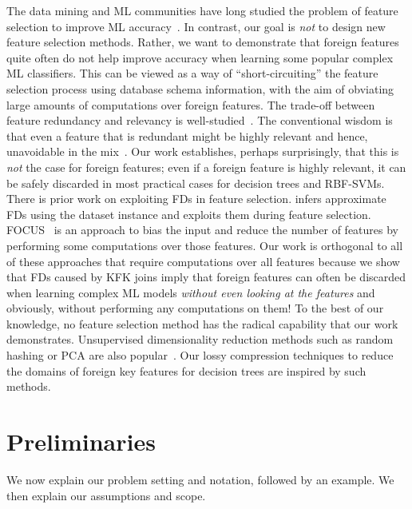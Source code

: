 \documentclass[sigconf]{acmart}
\begin{document}
The data mining and ML communities have long studied the problem of feature selection to improve ML accuracy~\cite{guyonbook,hastie}.
In contrast, our goal is \textit{not} to design new feature selection methods. Rather, we want to demonstrate that foreign features quite often do not help improve 
accuracy when learning some popular complex ML classifiers. This can be viewed as a way of ``short-circuiting'' the feature selection process using database schema 
information, with the aim of obviating large amounts of computations over foreign features.
The trade-off between feature redundancy and relevancy is well-studied~\cite{guyonbook,leiyu,daphnekoller}. The conventional wisdom is that even a feature that is 
redundant might be highly relevant and hence, unavoidable in the mix~\cite{guyonbook}. Our work establishes, perhaps surprisingly, that this is \textit{not} the case 
for foreign features; even if a foreign feature is highly relevant, it can be safely discarded in most practical cases for decision trees and RBF-SVMs.
There is prior work on exploiting FDs in feature selection.
\cite{approxfds} infers approximate FDs using the dataset instance and exploits them during feature selection.
FOCUS~\cite{focus} is an approach to bias the input and reduce the number of features by performing some computations over those features.
Our work is orthogonal to all of these approaches that require computations over all features because we show that FDs caused by KFK joins imply that foreign features 
can often be discarded when learning complex ML models \textit{without even looking at the features} and obviously, without performing any computations on them!
To the best of our knowledge, no feature selection method has the radical capability that our work demonstrates.
Unsupervised dimensionality reduction methods such as random hashing or PCA are also popular~\cite{hastie,mitchellbook}. Our lossy compression techniques to 
reduce the domains of foreign key features for decision trees are inspired by such methods.



\section{Preliminaries}
We now explain our problem setting and notation, followed by an example. We then explain our assumptions and scope.
\end{document}
